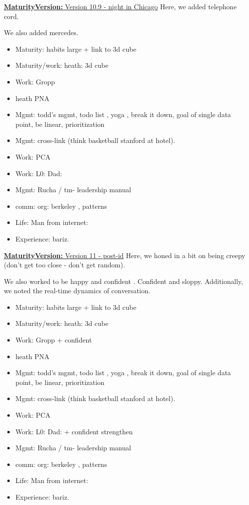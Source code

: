 \documentclass[11pt]{article}
\newcommand{\newMaturityVersion}[1]{\underline{\textbf{MaturityVersion:} #1} }
\begin{document}
\newMaturityVersion{Version 10.9 - night in Chicago}
Here, we added telephone cord. 

We also added mercedes. 

\begin{itemize} 
\item Maturity: habits large + link to 3d cube 
\item Maturity/work: heath: 3d cube 
\item Work: Gropp 
\item heath PNA 
\item Mgmt: todd's mgmt, todo list , yoga , break it down, goal of single data point, be linear, prioritization 
\item Mgmt: cross-link (think basketball stanford at hotel). 

\item Work: PCA
\item Work: L0: Dad: 
\item Mgmt: Rucha / tm- leadership manual 

\item comm: org: berkeley , patterns 
\item Life: Man from internet: 
\item Experience: bariz. 
\end{itemize}


\newMaturityVersion{Version 11 - post-id}
Here, we honed  in a bit on being creepy (don't get too close - don't get random). 

We also worked to be happy and confident . Confident and sloppy. 
Additionally, we noted the real-time dynamics of conversation. 

\begin{itemize} 
\item Maturity: habits large + link to 3d cube 
\item Maturity/work: heath: 3d cube 
\item Work:  Gropp + confident 
\item heath PNA 
\item Mgmt: todd's mgmt, todo list , yoga , break it down, goal of single data point, be linear, prioritization 
\item Mgmt: cross-link (think basketball stanford at hotel). 

\item Work: PCA
\item Work: L0: Dad: + confident strengthen 
\item Mgmt: Rucha / tm- leadership manual 

\item comm: org: berkeley , patterns 
\item Life: Man from internet: 
\item Experience: bariz. 
\end{itemize}
\end{document}
